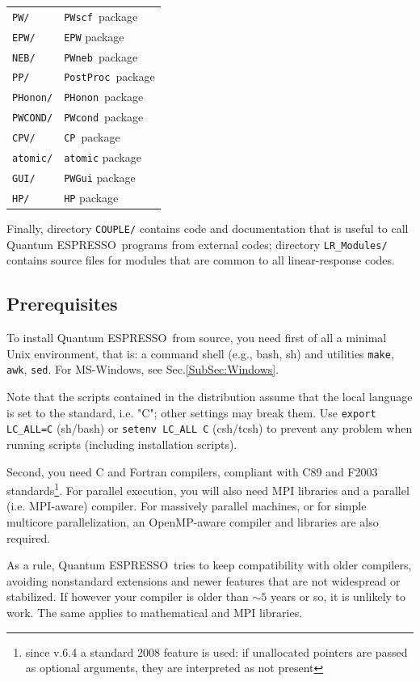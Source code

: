 \documentclass[12pt,a4paper]{article}
\def\qe{{\sc Quantum ESPRESSO}}
\def\PWscf{\texttt{PWscf}}
\def\PHonon{\texttt{PHonon}}
\def\CP{\texttt{CP}}
\def\PostProc{\texttt{PostProc}}
\def\NEB{\texttt{PWneb}}
\def\make{\texttt{make}}
\begin{document}
\begin{tabular}{ll}
\texttt{PW/}      & \PWscf\ package\\
\texttt{EPW/}     & \texttt{EPW} package\\
\texttt{NEB/}     & \NEB\ package\\
\texttt{PP/}      & \PostProc\ package\\
\texttt{PHonon/}  & \PHonon\ package\\
\texttt{PWCOND/}  & \texttt{PWcond}\ package\\
\texttt{CPV/}     & \CP\ package\\
\texttt{atomic/}  & \texttt{atomic} package\\
\texttt{GUI/}     & \texttt{PWGui} package\\
\texttt{HP/}      & \texttt{HP} package
\end{tabular}

Finally, directory \texttt{COUPLE/} contains code and documentation
that is useful to call \qe\ programs from external codes; directory
\texttt{LR\_Modules/} contains source files for modules that are common
to all linear-response codes.
\subsection{Prerequisites}
\label{Sec:Installation}

To install \qe\ from source, you need first of all a minimal Unix
environment, that is: a command shell (e.g., bash, sh) and utilities \make,
\texttt{awk}, \texttt{sed}. For MS-Windows, see Sec.\ref{SubSec:Windows}.

Note that the scripts contained
in the distribution assume that the local  language is set to the
standard, i.e. "C"; other settings
may break them. Use \texttt{export LC\_ALL=C} (sh/bash) or
\texttt{setenv LC\_ALL C} (csh/tcsh) to prevent any problem
when running scripts (including installation scripts).

Second, you need C and Fortran compilers, compliant with C89 and
F2003 standards\footnote{since v.6.4 a standard 2008 feature is
used: if unallocated pointers are passed as optional arguments,
they are interpreted as not present}. For parallel
execution, you will also need MPI libraries and a parallel
(i.e. MPI-aware) compiler. For massively parallel machines, or
for simple multicore parallelization, an OpenMP-aware compiler
and libraries are also required.

As a rule, \qe\ tries to keep compatibility with older compilers,
avoiding nonstandard extensions and newer features that
are not widespread or stabilized. If however your compiler is older 
than $\sim 5$ years or so, it is unlikely to work. The same applies
to mathematical and MPI libraries.
\end{document}
